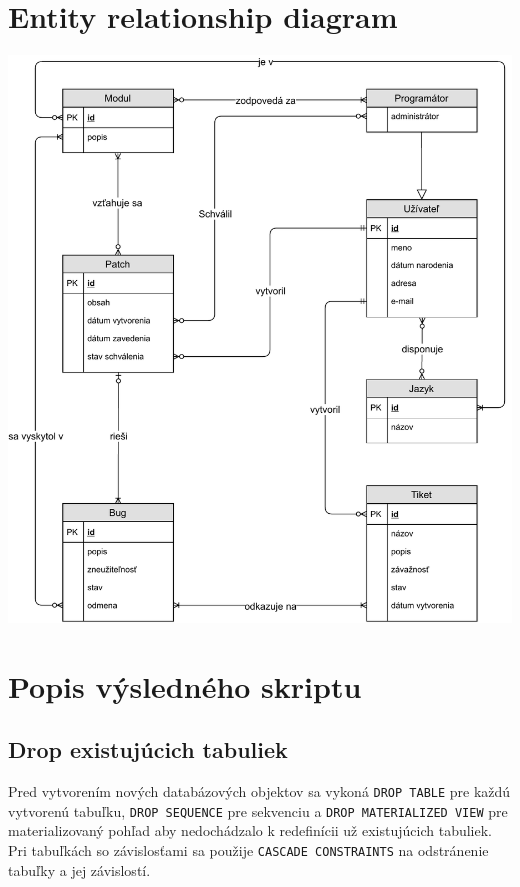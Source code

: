 \documentclass[11pt, a4paper]{article}
\begin{document}
    \section{Entity relationship diagram}
    \label{sec:entity-relationship-diagram}
    \begin{center}
        \vspace*{\fill}
        \includegraphics[width=0.95\linewidth]{ER_diagram.pdf}
        \vspace*{\fill}
    \end{center}

    \newpage

    \section{Popis výsledného skriptu}
    \label{sec:popis-výsledného-skriptu}

    \subsection{Drop existujúcich tabuliek}\label{subsec:drop-existujúcich-tabuliek}

    Pred vytvorením nových databázových objektov sa vykoná \texttt{DROP TABLE} pre každú vytvorenú tabuľku, \texttt{DROP SEQUENCE} pre sekvenciu a \texttt{DROP MATERIALIZED VIEW} pre materializovaný pohľad aby nedochádzalo k redefinícii už existujúcich tabuliek.
    Pri tabuľkách so závislosťami sa použije \texttt{CASCADE CONSTRAINTS} na odstránenie tabuľky a jej závislostí.
\end{document}
